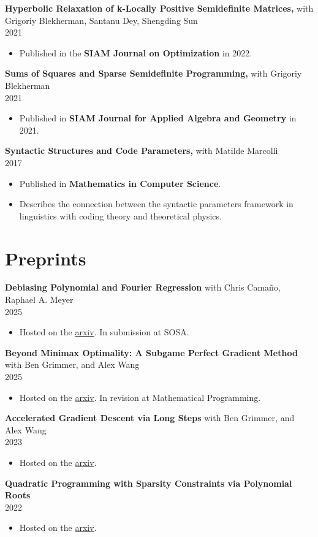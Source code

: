 \documentclass[margin]{res}
\begin{document}
\begin{resume}
\begin{itemize}
\end{itemize}
{\bf    Hyperbolic Relaxation of k-Locally Positive Semidefinite Matrices,} with Grigoriy Blekherman, Santanu Dey, Shengding Sun\\ 2021
\begin{itemize} \itemsep -2pt %
\item Published in the \textbf{SIAM Journal on Optimization} in 2022.
\end{itemize}
{\bf   Sums of Squares and Sparse Semidefinite Programming,} with Grigoriy Blekherman \\ 2021
\begin{itemize} \itemsep -2pt %
\item Published in \textbf{SIAM Journal for Applied Algebra and Geometry} in 2021.
\end{itemize}
{\bf  Syntactic Structures and Code Parameters,} with Matilde Marcolli \\ 2017
\begin{itemize} \itemsep -2pt %
\item Published in \textbf{Mathematics in Computer Science}.
\item Describes the connection between the syntactic parameters framework in linguistics with coding theory and theoretical physics.
\end{itemize}

\section{Preprints}
{\bf  Debiasing Polynomial and Fourier Regression} with Chris Camaño, Raphael A. Meyer \\ 2025
\begin{itemize} \itemsep -2pt %
\item Hosted on the \href{https://arxiv.org/abs/2508.05920}{arxiv}. In submission at SOSA.
\end{itemize}
{\bf  Beyond Minimax Optimality: A Subgame Perfect Gradient Method} with Ben Grimmer, and Alex Wang \\ 2025
\begin{itemize} \itemsep -2pt %
\item Hosted on the \href{https://arxiv.org/abs/2412.06731}{arxiv}. In revision at Mathematical Programming.
\end{itemize}
{\bf  Accelerated Gradient Descent via Long Steps} with Ben Grimmer, and Alex Wang \\ 2023
\begin{itemize} \itemsep -2pt %
\item Hosted on the \href{https://arxiv.org/abs/2309.09961}{arxiv}.
\end{itemize}
{\bf  Quadratic Programming with Sparsity Constraints via Polynomial Roots } \\ 2022
\begin{itemize} \itemsep -2pt %
\item Hosted on the \href{https://arxiv.org/abs/2208.11143}{arxiv}.
\end{itemize}


\end{resume}
\end{document}
